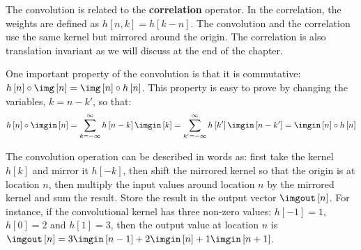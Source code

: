 The convolution is related to the {\bf correlation} operator. In the correlation, the weights are defined as $h\left[n, k \right]=h\left[k-n \right]$. The convolution and the correlation use the same kernel but mirrored around the origin.
The correlation is also translation invariant as we will discuss at the end of the chapter.


One important property of the convolution is that it is commutative:
$h\left[n\right] \circ \img \left[n\right] = \img \left[n\right] \circ h\left[n\right]$.
This property is easy to prove by changing the variables, $k = n - k'$, so that:
\begin{equation}
	h \left[n\right] \circ \imgin \left[n\right] =
	\sum_{k=-\infty}^{\infty} h \left[n-k \right] \imgin \left[k \right] = \sum_{k'=-\infty}^{\infty} h \left[k' \right] \imgin \left[n-k' \right]  =
	\imgin \left[n\right] \circ h \left[n\right]
\end{equation}

The convolution operation can be described in words as: first take the kernel $h\left[k\right]$ and mirror it $h\left[-k \right]$, then shift the mirrored kernel so that the origin is at location $n$, then multiply the input values around location $n$ by the mirrored kernel and sum the result. Store the result in the output vector $\imgout \left[n\right]$. For instance, if the convolutional kernel has three non-zero values: $h\left[-1 \right] =1$,  $h\left[0 \right] = 2$ and $h\left[1 \right] = 3$, then the output value at location $n$ is $\imgout \left[n\right] = 3 \imgin \left[n-1\right]+2 \imgin \left[n\right] + 1 \imgin \left[n+1\right]$.


